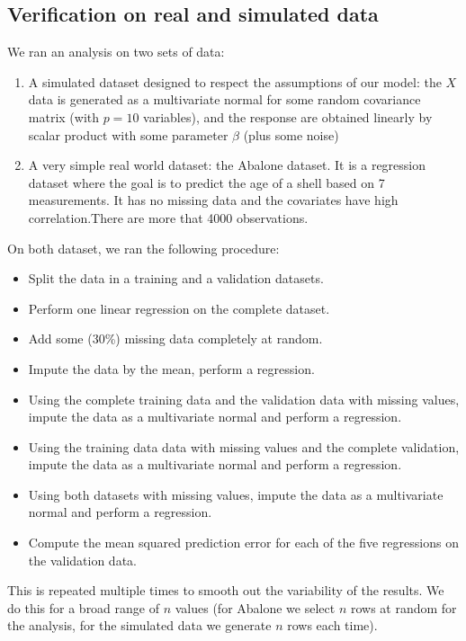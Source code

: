 		\subsection{Verification on real and simulated data}
We ran an analysis on two sets of data:
\begin{enumerate}
\item A simulated dataset designed to respect the assumptions of our model: the $X$ data is generated as a multivariate normal for some random covariance matrix (with $p=10$ variables), and the response are obtained linearly by scalar product with some parameter $\beta$ (plus some noise)
\item A very simple real world dataset: the Abalone dataset. It is a regression dataset where the goal is to predict the age of a shell based on 7 measurements. It has no missing data and the covariates have high correlation.There are more that 4000 observations.
\end{enumerate}

On both dataset, we ran the following procedure:
\begin{itemize}
\item Split the data in a training and a validation datasets.
\item Perform one linear regression on the complete dataset.
\item Add some (30\%) missing data completely at random.
\item Impute the data by the mean, perform a regression.
\item Using the complete training data and the validation data with missing values, impute the data as a multivariate normal and perform a regression.
\item Using the training data data with missing values and the complete validation, impute the data as a multivariate normal and perform a regression.
\item Using both datasets with missing values, impute the data as a multivariate normal and perform a regression.
\item Compute the mean squared prediction error for each of the five regressions on the validation data.
\end{itemize}
		
This is repeated multiple times to smooth out the variability of the results. We do this for a broad range of $n$ values (for Abalone we select $n$ rows at random for the analysis, for the simulated data we generate $n$ rows each time).

